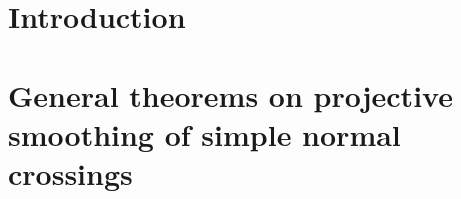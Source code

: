 \documentclass[11pt,twoside]{amsart}
\theoremstyle{plain}
\numberwithin{equation}{section}
\newtheorem{lemma}[theorem]{Lemma}
\theoremstyle{definition}
\newtheorem{remark}[theorem]{Remark}
\begin{document}
\section{Introduction}


\section{General theorems on projective smoothing of simple normal crossings }\label{main results}

\end{document}
